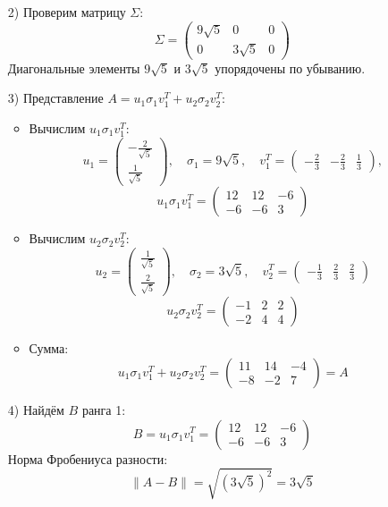 \documentclass[a4paper]{article}
\begin{document}
\begin{enumerate}
\begin{enumerate}
    \item[2)] Проверим матрицу $\Sigma$:
      \[
      \Sigma = \begin{pmatrix}
      9\sqrt{5} & 0 & 0 \\
      0 & 3\sqrt{5} & 0
      \end{pmatrix}
      \]
      Диагональные элементы \( 9\sqrt{5} \) и \( 3\sqrt{5} \) упорядочены по убыванию.\\

  \item[3)]Представление \( A = u_1\sigma_1v_1^T + u_2\sigma_2v_2^T \):
  \begin{itemize}
    \item Вычислим \( u_1\sigma_1v_1^T \):
    \[
    u_1 = \begin{pmatrix} -\frac{2}{\sqrt{5}} \\ \frac{1}{\sqrt{5}}
      \end{pmatrix}, \quad \sigma_1 = 9\sqrt{5}, \quad v_1^T = 
      \begin{pmatrix} -\frac{2}{3} & -\frac{2}{3} & \frac{1}{3} \end{pmatrix},
    \]
    \[
    u_1\sigma_1v_1^T = \begin{pmatrix} 12 & 12 & -6 \\ -6 & -6 & 3 \end{pmatrix}
    \]

    \item Вычислим \( u_2\sigma_2v_2^T \):
    \[
    u_2 = \begin{pmatrix} \frac{1}{\sqrt{5}} \\ \frac{2}{\sqrt{5}} \end{pmatrix}, \quad \sigma_2 = 
    3\sqrt{5}, \quad v_2^T = \begin{pmatrix} 
      -\frac{1}{3} & \frac{2}{3} & \frac{2}{3} \end{pmatrix}
    \]
    \[
    u_2\sigma_2v_2^T = \begin{pmatrix} -1 & 2 & 2 \\ -2 & 4 & 4 \end{pmatrix}
    \]

    \item Сумма:
    \[
    u_1\sigma_1v_1^T + u_2\sigma_2v_2^T = \begin{pmatrix} 11 & 14 & -4 \\ -8 & -2 & 7 \end{pmatrix} = A
    \]
  \end{itemize}

  \item[4)] Найдём $B$ ранга 1:
  \[
  B = u_1\sigma_1v_1^T = \begin{pmatrix} 12 & 12 & -6 \\ -6 & -6 & 3 \end{pmatrix}
  \]
  Норма Фробениуса разности:
  \[
  \|A - B\| = \sqrt{(3\sqrt{5})^2} = 3\sqrt{5}
  \]
  \end{enumerate}


\end{enumerate}
\end{document}
